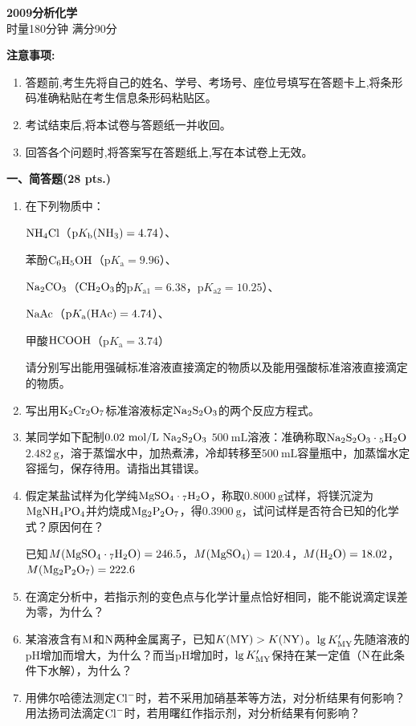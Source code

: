 \begin{center}
    {\LARGE \textbf{2009分析化学}} \\[2ex]
    {\large 时量180分钟 \quad 满分90分}
\end{center}

\vspace{0.5cm}
\noindent\textbf{注意事项:}
\begin{enumerate}[label=\arabic*., parsep=0pt, itemsep=0pt]
    \item 答题前,考生先将自己的姓名、学号、考场号、座位号填写在答题卡上,将条形码准确粘贴在考生信息条形码粘贴区。
    \item 考试结束后,将本试卷与答题纸一并收回。
    \item 回答各个问题时,将答案写在答题纸上,写在本试卷上无效。
\end{enumerate}

\vspace{0.5cm}
\noindent\textbf{一、简答题(28 pts.)}

\begin{enumerate}[label=\arabic*., itemsep=1.5ex]
    \item 在下列物质中：
    
    $\ce{NH4Cl}$（$\mathrm{p}K_\mathrm{b}(\ce{NH3})=4.74$）、
    
    苯酚$\ce{C6H5OH}$（$\mathrm{p}K_\mathrm{a}=9.96$）、
    
    $\ce{Na2CO3}$（$\ce{CH2O3}$的$\mathrm{p}K_{\mathrm{a1}}=6.38$，$\mathrm{p}K_{\mathrm{a2}}=10.25$）、
    
    $\ce{NaAc}$（$\mathrm{p}K_\mathrm{a}(\ce{HAc})=4.74$）、
    
    甲酸$\ce{HCOOH}$（$\mathrm{p}K_\mathrm{a}=3.74$）

    请分别写出能用强碱标准溶液直接滴定的物质以及能用强酸标准溶液直接滴定的物质。
    \item 写出用$\ce{K2Cr2O7}$标准溶液标定$\ce{Na2S2O3}$的两个反应方程式。
    \item 某同学如下配制$0.02\ \mathrm{mol/L}\ \ce{Na2S2O3}$ $500\ \mathrm{mL}$溶液：准确称取$\ce{Na2S2O3\cdot 5H2O}$ $2.482\ \mathrm{g}$，溶于蒸馏水中，加热煮沸，冷却转移至$500\ \mathrm{mL}$容量瓶中，加蒸馏水定容摇匀，保存待用。请指出其错误。
    \item 假定某盐试样为化学纯$\ce{MgSO4\cdot 7H2O}$，称取$0.8000\ \mathrm{g}$试样，将镁沉淀为$\ce{MgNH4PO4}$并灼烧成$\ce{Mg2P2O7}$，得$0.3900\ \mathrm{g}$，试问试样是否符合已知的化学式？原因何在？
    
    已知$M(\ce{MgSO4\cdot 7H2O})=246.5$，$M(\ce{MgSO4})=120.4$，$M(\ce{H2O})=18.02$，$M(\ce{Mg2P2O7})=222.6$
    \item 在滴定分析中，若指示剂的变色点与化学计量点恰好相同，能不能说滴定误差为零，为什么？
    \item 某溶液含有$\ce{M}$和$\ce{N}$两种金属离子，已知$K(\ce{MY}) > K(\ce{NY})$。$\lg K'_{\ce{MY}}$先随溶液的$\mathrm{pH}$增加而增大，为什么？而当$\mathrm{pH}$增加时，$\lg K'_{\ce{MY}}$保持在某一定值（$\ce{N}$在此条件下水解），为什么？
    \item 用佛尔哈德法测定$\ce{Cl-}$时，若不采用加硝基苯等方法，对分析结果有何影响？用法扬司法滴定$\ce{Cl-}$时，若用曙红作指示剂，对分析结果有何影响？
\end{enumerate}

